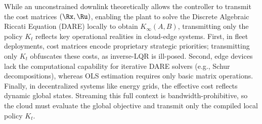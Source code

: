 \documentclass[11pt,journal,onecolumn]{IEEEtran}
\begin{document}
While an unconstrained downlink theoretically allows the controller to transmit the cost matrices $(\Rx, \Ru)$, enabling the plant to solve the Discrete Algebraic Riccati Equation (DARE) locally to obtain $K_\infty(A,B)$, transmitting only the policy $K_t$ reflects key operational realities in cloud-edge systems. 
First, in fleet deployments, cost matrices encode proprietary strategic priorities; transmitting only $K_t$ obfuscates these costs, as inverse-LQR is ill-posed. Second, edge devices lack the computational capability for iterative DARE solvers (e.g., Schur decompositions), whereas OLS estimation requires only basic matrix operations. Finally, in decentralized systems like energy grids, the effective cost reflects dynamic global states. Streaming this full context is bandwidth-prohibitive, so the cloud must evaluate the global objective and transmit only the compiled local policy $K_t$.
\end{document}
